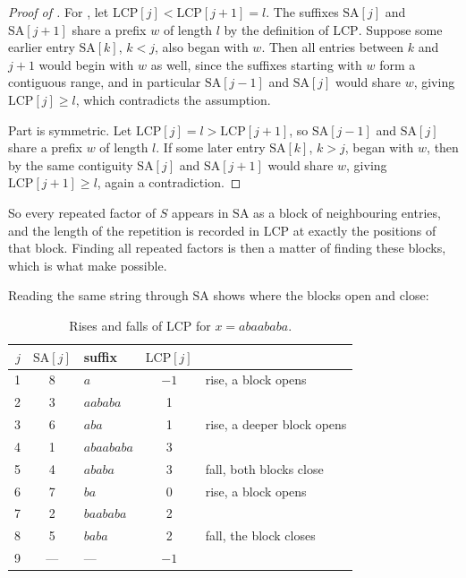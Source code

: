 \begin{proof}[Proof of ] 
    For , let \(\mathrm{LCP}[j] < \mathrm{LCP}[j+1] = l\). The suffixes \(\mathrm{SA}[j]\) and \(\mathrm{SA}[j+1]\) share a prefix \(w\) of length \(l\) by the definition of \(\mathrm{LCP}\). Suppose some earlier entry \(\mathrm{SA}[k]\), \(k < j\), also began with \(w\). Then all entries between \(k\) and \(j+1\) would begin with \(w\) as well, since the suffixes starting with \(w\) form a contiguous range, and in particular \(\mathrm{SA}[j-1]\) and \(\mathrm{SA}[j]\) would share \(w\), giving \(\mathrm{LCP}[j] \geq l\), which contradicts the assumption.
    
    Part  is symmetric. Let \(\mathrm{LCP}[j] = l > \mathrm{LCP}[j+1]\), so \(\mathrm{SA}[j-1]\) and \(\mathrm{SA}[j]\) share a prefix \(w\) of length \(l\). If some later entry \(\mathrm{SA}[k]\), \(k > j\), began with \(w\), then by the same contiguity \(\mathrm{SA}[j]\) and \(\mathrm{SA}[j+1]\) would share \(w\), giving \(\mathrm{LCP}[j+1] \geq l\), again a contradiction.
\end{proof}

So every repeated factor of \(S\) appears in \(\mathrm{SA}\) as a block of neighbouring entries, and the length of the repetition is recorded in \(\mathrm{LCP}\) at exactly the positions of that block. Finding all repeated factors is then a matter of finding these blocks, which is what  make possible.

\noindent Reading the same string through \(\mathrm{SA}\) shows where the blocks open and close:
\begin{table}[H]
    \centering
    \begin{tabular}{r|clcl}
        \toprule
        \(j\) & \(\mathrm{SA}[j]\) & suffix & \(\mathrm{LCP}[j]\) & \\
        \midrule
        1 & 8 & \(a\)        & \(-1\) & rise, a block opens \\
        2 & 3 & \(aababa\)   & 1      & \\
        3 & 6 & \(aba\)      & 1      & rise, a deeper block opens \\
        4 & 1 & \(abaababa\) & 3      & \\
        5 & 4 & \(ababa\)    & 3      & fall, both blocks close \\
        6 & 7 & \(ba\)       & 0      & rise, a block opens \\
        7 & 2 & \(baababa\)  & 2      & \\
        8 & 5 & \(baba\)     & 2      & fall, the block closes \\
        9 & --- & ---        & \(-1\) & \\
        \bottomrule
    \end{tabular}
    \caption{Rises and falls of \(\mathrm{LCP}\) for \(x = abaababa\).}
    \label{tab:rises-falls}
\end{table}

